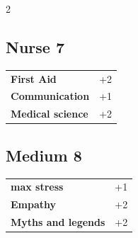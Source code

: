 \begin{multicols}{2}
\begin{tcolorbox}

\end{tcolorbox}

\begin{tcolorbox}
    \subsection*{Nurse \hfill \small{7 }}
    \tcblower




\begin{tabular}{@{}ll@{}}
    \textbf{First Aid} & +2\\
    \textbf{Communication} & +1\\
    \textbf{Medical science} & +2\\
\end{tabular}


\end{tcolorbox}

\begin{tcolorbox}
    \subsection*{Medium \hfill \small{8 }}
    \tcblower




\begin{tabular}{@{}ll@{}}
    \textbf{max stress} & +1\\
    \textbf{Empathy} & +2\\
    \textbf{Myths and legends} & +2\\
\end{tabular}


\end{tcolorbox}


\end{multicols}
